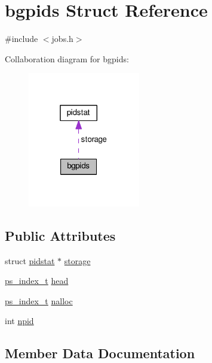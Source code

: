 \hypertarget{structbgpids}{}\section{bgpids Struct Reference}
\label{structbgpids}


{\ttfamily \#include $<$jobs.\+h$>$}



Collaboration diagram for bgpids\+:
\nopagebreak
\begin{figure}[H]
\begin{center}
\leavevmode
\includegraphics[width=139pt]{structbgpids__coll__graph}
\end{center}
\end{figure}
\subsection*{Public Attributes}
\begin{DoxyCompactItemize}
\item 
struct \hyperlink{structpidstat}{pidstat} $\ast$ \hyperlink{structbgpids_a9e1b9f32d9f6e5db5387b07d9e5440ff}{storage}
\item 
\hyperlink{jobs_8h_a677d6488545fa3193e7cb54647b4ae5c}{ps\+\_\+index\+\_\+t} \hyperlink{structbgpids_adf6139c912fc1e79278110429b95aaee}{head}
\item 
\hyperlink{jobs_8h_a677d6488545fa3193e7cb54647b4ae5c}{ps\+\_\+index\+\_\+t} \hyperlink{structbgpids_a370d36e85fac1b1cf2fdbc18b66903ae}{nalloc}
\item 
int \hyperlink{structbgpids_a3b393c1d3d52cb76efbe24e0fffc2871}{npid}
\end{DoxyCompactItemize}


\subsection{Member Data Documentation}
